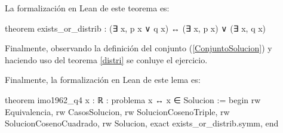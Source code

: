\begin{demostracion}
  La formalización en Lean de este teorema es:

  \begin{leancode}
    theorem exists_or_distrib : (∃ x, p x ∨ q x) ↔
    (∃ x, p x) ∨ (∃ x, q x)
  \end{leancode}
  
  Finalmente, observando la definición del conjunto
  (\ref{ConjuntoSolucion}) y haciendo uso del teorema \ref{distri}
  se conluye el ejercicio.
\end{demostracion}

Finalmente, la formalización en Lean de este lema es:
\begin{leancode}
theorem imo1962_q4 {x : ℝ} : problema x ↔ x ∈ Solucion :=
begin
  rw Equivalencia,
  rw CasosSolucion,
  rw SolucionCosenoTriple,
  rw SolucionCosenoCuadrado,
  rw Solucion,
  exact exists_or_distrib.symm,
end
\end{leancode}
